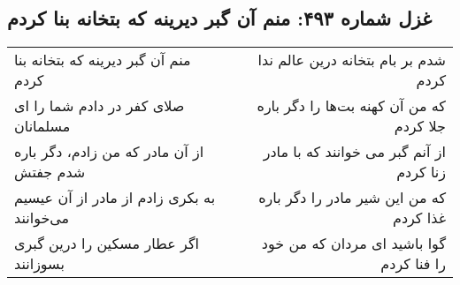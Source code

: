 \begin{center}
\section*{غزل شماره ۴۹۳: منم آن گبر دیرینه که بتخانه بنا کردم}
\label{sec:493}
\begin{longtable}{l p{0.5cm} r}
منم آن گبر دیرینه که بتخانه بنا کردم
&&
شدم بر بام بتخانه درین عالم ندا کردم
\\
صلای کفر در دادم شما را ای مسلمانان
&&
که من آن کهنه بت‌ها را دگر باره جلا کردم
\\
از آن مادر که من زادم، دگر باره شدم جفتش
&&
از آنم گبر می خوانند که با مادر زنا کردم
\\
به بکری زادم از مادر از آن عیسیم می‌خوانند
&&
که من این شیر مادر را دگر باره غذا کردم
\\
اگر عطار مسکین را درین گبری بسوزانند
&&
گوا باشید ای مردان که من خود را فنا کردم
\\
\end{longtable}
\end{center}
